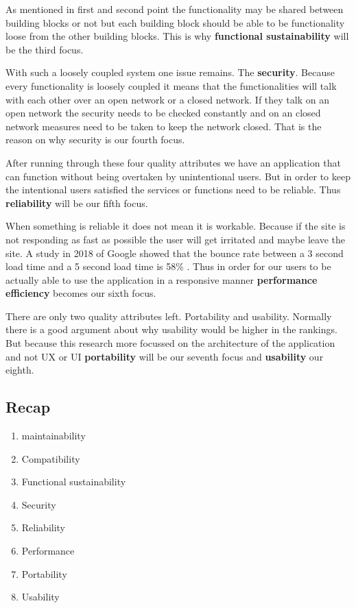 As mentioned in first and second point the functionality may be shared between building blocks or not but each building block should be able to be functionality loose from the other building blocks. This is why \textbf{functional sustainability} will be the third focus.

With such a loosely coupled system one issue remains. The \textbf{security}. Because every functionality is loosely coupled it means that the functionalities will talk with each other over an open network or a closed network. If they talk on an open network the security needs to be checked constantly and on an closed network measures need to be taken to keep the network closed. That is the reason on why security is our fourth focus.

After running through these four quality attributes we have an application that can function without being overtaken by unintentional users. But in order to keep the intentional users satisfied the services or functions need to be reliable. Thus \textbf{reliability} will be our fifth focus.

When something is reliable it does not mean it is workable. Because if the site is not responding as fast as possible the user will get irritated and maybe leave the site. A study in 2018 of Google showed that the bounce rate between a 3 second load time and a 5 second load time is 58\% \cite{bounceRateDifference}. Thus in order for our users to be actually able to use the application in a responsive manner \textbf{performance efficiency} becomes our sixth focus.

There are only two quality attributes left. Portability and usability. Normally there is a good argument about why usability would be higher in the rankings. But because this research more focussed on the architecture of the application and not UX or UI \textbf{portability} will be our seventh focus and \textbf{usability} our eighth.

\subsection{Recap}
\label{sec:IsoRecap}

\begin{enumerate}
        \item maintainability
        \item Compatibility
        \item Functional sustainability
        \item Security
        \item Reliability
        \item Performance
        \item Portability
        \item Usability
\end{enumerate}

